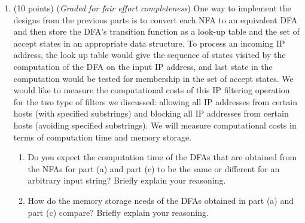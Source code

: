 \begin{enumerate}
\begin{enumerate}
\item (10 points) ({\it Graded for fair effort completeness}) 
One way to implement the designs from the previous parts is to convert each NFA to 
an equivalent DFA and then store the DFA's transition function as a look-up table and the 
set of accept states in an appropriate data structure.  To process an incoming 
IP address, the look up table would give the sequence of states visited by the computation 
of the DFA on the input IP address, and last state in the computation would be tested for membership
in the set of accept states. We would like to measure the
computational costs of this IP filtering operation for the two type of filters we discussed: allowing
all IP addresses from certain hosts (with specified substrings) and blocking all IP addresses from certain
hosts (avoiding specified substrings). We will measure computational costs
in terms of computation time and memory storage.  
\begin{enumerate}
\item Do you expect the computation time of the DFAs that are obtained 
from the NFAs for  part (a) and part (c) to be the same or 
different for an arbitrary input string?  Briefly explain your reasoning.
\item How do the memory storage needs of the DFAs obtained in part (a) and part (c) 
compare? Briefly explain your reasoning.
\end{enumerate}
\end{enumerate}



\end{enumerate}
